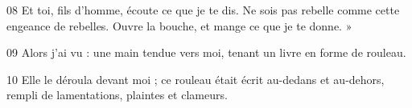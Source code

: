 
08 Et toi, fils d’homme, écoute ce que je te dis. Ne sois pas rebelle comme cette engeance de rebelles. Ouvre la bouche, et mange ce que je te donne. »

09 Alors j’ai vu : une main tendue vers moi, tenant un livre en forme de rouleau.

10 Elle le déroula devant moi ; ce rouleau était écrit au-dedans et au-dehors, rempli de lamentations, plaintes et clameurs.

